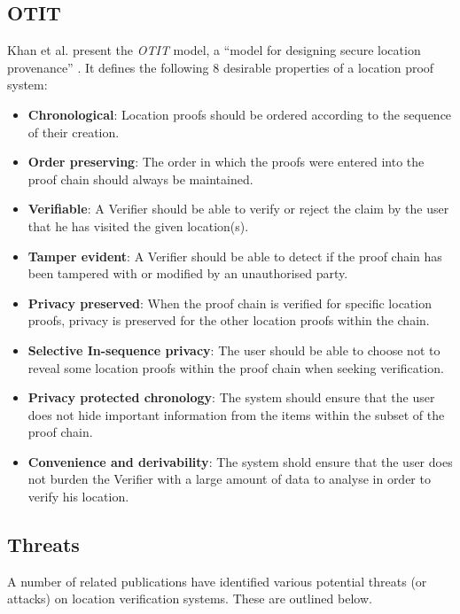 \subsection{OTIT} \label{ssec:otit}
Khan et al. present the \textit{OTIT} model, a ``model for designing secure location provenance'' \cite{otit}. It defines the following 8 desirable properties of a location proof system:
\begin{itemize}
	\item[] \textbf{Chronological}: Location proofs should be ordered according to the sequence of their creation.
	\item[] \textbf{Order preserving}: The order in which the proofs were entered into the proof chain should always be maintained.
	\item[] \textbf{Verifiable}: A Verifier should be able to verify or reject the claim by the user that he has visited the given location(s).
	\item[] \textbf{Tamper evident}: A Verifier should be able to detect if the proof chain has been tampered with or modified by an unauthorised party.
	\item[] \textbf{Privacy preserved}: When the proof chain is verified for specific location proofs, privacy is preserved for the other location proofs within the chain.
	\item[] \textbf{Selective In-sequence privacy}: The user should be able to choose not to reveal some location proofs within the proof chain when seeking verification.
	\item[] \textbf{Privacy protected chronology}: The system should ensure that the user does not hide important information from the items within the subset of the proof chain.
	\item[] \textbf{Convenience and derivability}: The system shold ensure that the user does not burden the Verifier with a large amount of data to analyse in order to verify his location.
\end{itemize}

\subsection{Threats} \label{ssec:threats}
A number of related publications \cite{luo,khan} have identified various potential threats (or attacks) on location verification systems. These are outlined below.


